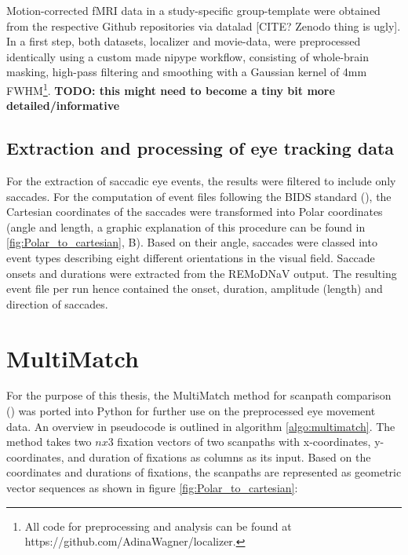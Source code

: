 \documentclass[a4paper, 12pt]{scrreprt}
\begin{document}
Motion-corrected fMRI data in a study-specific group-template were obtained from the respective Github repositories via datalad [CITE? Zenodo thing is ugly]. In a first step, both datasets, localizer and movie-data, were preprocessed identically using a custom made nipype workflow, consisting of whole-brain masking, high-pass filtering and smoothing with a Gaussian kernel of 4mm FWHM\footnote{All code for preprocessing and analysis can be found at https://github.com/AdinaWagner/localizer.}. \newline \textbf{TODO: this might need to become a tiny bit more detailed/informative}

\subsection{Extraction and processing of eye tracking data}

For the extraction of saccadic eye events, the results were filtered to include only saccades. For the computation of event files following the BIDS standard (\cite{gorgolewski2016brain}), the Cartesian coordinates of the saccades were transformed into Polar coordinates (angle and length, a graphic explanation of this procedure can be found in \ref{fig:Polar_to_cartesian}, B). Based on their angle, saccades were classed into event types describing eight different orientations in the visual field. Saccade onsets and durations were extracted from the REMoDNaV output. The resulting event file per run hence contained the onset, duration, amplitude (length) and direction of saccades. \newline


\section{MultiMatch}\label{section:multimatch}
For the purpose of this thesis, the MultiMatch method for scanpath comparison (\cite{jarodzka2010vector}) was ported into Python for further use on the preprocessed eye movement data. An overview in pseudocode is outlined in algorithm \ref{algo:multimatch}. \newline 
The method takes two $n x 3$ fixation vectors of two scanpaths with x-coordinates, y-coordinates, and duration of fixations as columns as its input. Based on the coordinates and durations of fixations, the scanpaths are represented as geometric vector sequences as shown in figure \ref{fig:Polar_to_cartesian}:
\end{document}
